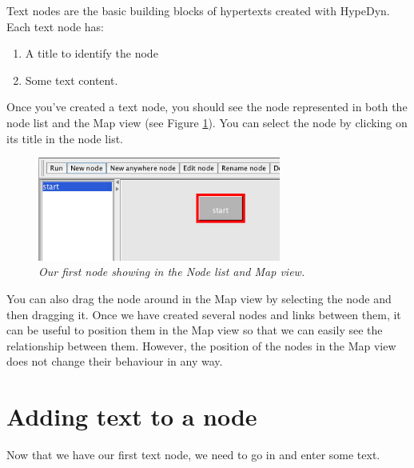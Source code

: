 \documentclass{article}
\begin{document}
Text nodes are the basic building blocks of hypertexts created with HypeDyn.
Each text node has: 
\begin{enumerate}
  \item A title to identify the node
  \item Some text content.
\end{enumerate}

Once you've created a text node, you should see the node represented in both the
node list and the Map view (see Figure \ref{fig:tut1:first_node}). You can select the
node by clicking on its title in the node list.
 
\begin{figure}[ht]
  \centering \includegraphics[width=8cm]{images/hypedyn-tutorial-1-figure-4}
  \caption{\textit{Our first node showing in the Node list and Map view.}}
  \label{fig:tut1:first_node}
\end{figure} 

You can also drag the node around in the Map view by selecting the node and then
dragging it. Once we have created several nodes and links between them, it can
be useful to position them in the Map view so that we can easily see the
relationship between them. However, the position of the nodes in the Map view
does not change their behaviour in any way.

\section{Adding text to a node}

Now that we have our first text node, we need to go in and enter some text.
\end{document}
